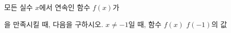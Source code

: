 모든 실수 $x$에서 연속인 함수 $f(x)$가\par\smallskip{}\par\smallskip\noindent 을 만족시킬 때, 다음을 구하시오.
 $x\ne -1$일 때, 함수 $f(x)$
 $f(-1)$의 값
